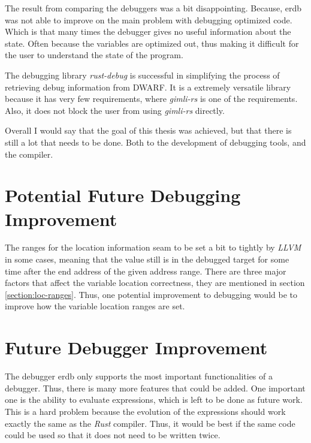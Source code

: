 

The result from comparing the debuggers was a bit disappointing.
Because, \gls{erdb} was not able to improve on the main problem with debugging optimized code.
Which is that many times the debugger gives no useful information about the state.
Often because the variables are optimized out, thus making it difficult for the user to understand the state of the program.


The debugging library \emph{rust-debug} is successful in simplifying the process of retrieving debug information from \gls{DWARF}.
It is a extremely versatile library because it has very few requirements, where \emph{gimli-rs} is one of the requirements.
Also, it does not block the user from using \emph{gimli-rs} directly.


Overall I would say that the goal of this thesis was achieved, but that there is still a lot that needs to be done.
Both to the development of debugging tools, and the compiler.


\section{Potential Future Debugging Improvement}
The ranges for the location information seam to be set a bit to tightly by \emph{LLVM} in some cases, meaning that the value still is in the debugged target for some time after the end address of the given address range.
There are three major factors that affect the variable location correctness, they are mentioned in section \ref{section:loc-ranges}.
Thus, one potential improvement to debugging would be to improve how the variable location ranges are set.


\section{Future Debugger Improvement}
The debugger \gls{erdb} only supports the most important functionalities of a debugger.
Thus, there is many more features that could be added.
One important one is the ability to evaluate expressions, which is left to be done as future work.
This is a hard problem because the evolution of the expressions should work exactly the same as the \emph{Rust} compiler.
Thus, it would be best if the same code could be used so that it does not need to be written twice.


